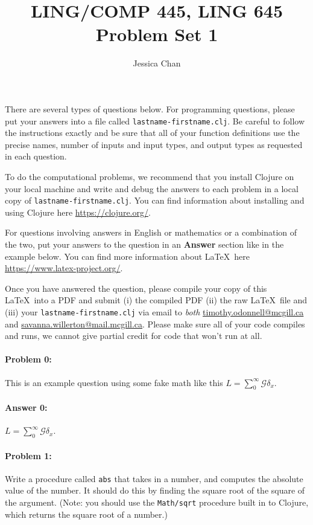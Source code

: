 \documentclass[10pt]{article}
\author{Jessica Chan}
\begin{document}
 
\title{LING/COMP 445, LING 645\\Problem Set 1}
\date{}
\maketitle


There are several types of questions below. For programming questions,
please put your answers into a file called
\texttt{lastname-firstname.clj}. Be careful to follow the instructions
exactly and be sure that all of your function definitions use the
precise names, number of inputs and input types, and output types as
requested in each question.

To do the computational problems, we recommend that you install
Clojure on your local machine and write and debug the answers to each
problem in a local copy of \texttt{lastname-firstname.clj}. You can
find information about installing and using Clojure here
\url{https://clojure.org/}.

For questions involving answers in English or mathematics or a
combination of the two, put your answers to the question in an
\textbf{Answer} section like in the example below. You can find more
information about \LaTeX\ here \url{https://www.latex-project.org/}.

Once you have answered the question, please compile your copy of this
\LaTeX\  into a PDF and submit (i) the compiled PDF (ii) the raw \LaTeX\
file and (iii) your \texttt{lastname-firstname.clj} via email to
{\em both} \href{mailto:timothy.odonnell@mcgill.ca}{timothy.odonnell@mcgill.ca} and
\href{mailto:savanna.willerton@mail.mcgill.ca}{savanna.willerton@mail.mcgill.ca}. Please make sure all of your
code compiles and runs, we cannot give partial credit for code that
won't run at all.


\hrulefill
\paragraph{Problem 0:}
This is an example question using some fake math like this
$L=\sum_0^{\infty} \mathcal{G} \delta_x$.

\paragraph{Answer 0:}  $L=\sum_0^{\infty} \mathcal{G} \delta_x$.


\hrulefill
\paragraph{Problem 1:}
Write a procedure called \texttt{abs} that takes in a number, and
computes the absolute value of the number. It should do this by
finding the square root of the square of the argument. (Note: you
should use the \texttt{Math/sqrt} procedure built in to Clojure, which
returns the square root of a number.)
\end{document}
